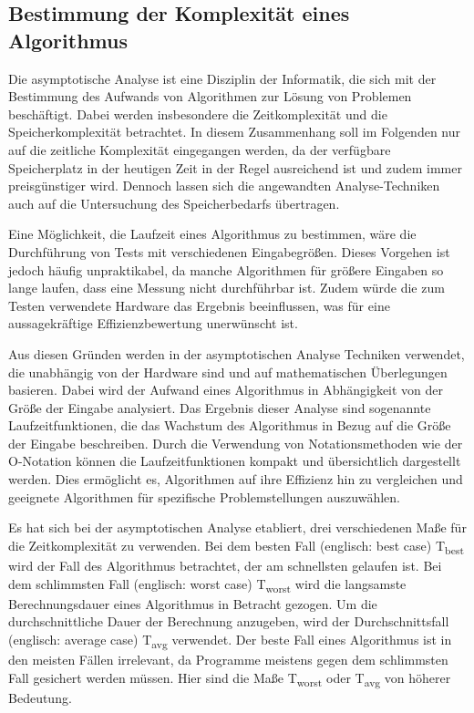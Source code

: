 \subsection{Bestimmung der Komplexität eines Algorithmus} \label{o-notation}
Die asymptotische Analyse ist eine Disziplin der Informatik, die sich mit der Bestimmung des Aufwands von Algorithmen zur Lösung von Problemen beschäftigt. Dabei werden insbesondere die Zeitkomplexität und die Speicherkomplexität betrachtet. In diesem Zusammenhang soll im Folgenden nur auf die zeitliche Komplexität eingegangen werden, da der verfügbare Speicherplatz in der heutigen Zeit in der Regel ausreichend ist und zudem immer preisgünstiger wird. Dennoch lassen sich die angewandten Analyse-Techniken auch auf die Untersuchung des Speicherbedarfs übertragen. \autocite[201]{hubwieser_fundamente_2015}

Eine Möglichkeit, die Laufzeit eines Algorithmus zu bestimmen, wäre die Durchführung von Tests mit verschiedenen Eingabegrößen. Dieses Vorgehen ist jedoch häufig unpraktikabel, da manche Algorithmen für größere Eingaben so lange laufen, dass eine Messung nicht durchführbar ist. Zudem würde die zum Testen verwendete Hardware das Ergebnis beeinflussen, was für eine aussagekräftige Effizienzbewertung unerwünscht ist.\autocite[201]{hubwieser_fundamente_2015}

Aus diesen Gründen werden in der asymptotischen Analyse Techniken verwendet, die unabhängig von der Hardware sind und auf mathematischen Überlegungen basieren. Dabei wird der Aufwand eines Algorithmus in Abhängigkeit von der Größe der Eingabe analysiert. Das Ergebnis dieser Analyse sind sogenannte Laufzeitfunktionen, die das Wachstum des Algorithmus in Bezug auf die Größe der Eingabe beschreiben. Durch die Verwendung von Notationsmethoden wie der O-Notation können die Laufzeitfunktionen kompakt und übersichtlich dargestellt werden. Dies ermöglicht es, Algorithmen auf ihre Effizienz hin zu vergleichen und geeignete Algorithmen für spezifische Problemstellungen auszuwählen.\autocite[201-203]{hubwieser_fundamente_2015}

Es hat sich bei der asymptotischen Analyse etabliert, drei verschiedenen Maße für die Zeitkomplexität zu verwenden. Bei dem besten Fall (englisch: best case) T\textsubscript{best} wird der Fall des Algorithmus betrachtet, der am schnellsten gelaufen ist. Bei dem schlimmsten Fall (englisch: worst case) T\textsubscript{worst} wird die langsamste Berechnungsdauer eines Algorithmus in Betracht gezogen. Um die durchschnittliche Dauer der Berechnung anzugeben, wird der Durchschnittsfall (englisch: average case) T\textsubscript{avg} verwendet. Der beste Fall eines Algorithmus ist in den meisten Fällen irrelevant, da Programme meistens gegen dem schlimmsten Fall gesichert werden müssen. Hier sind die Maße T\textsubscript{worst} oder T\textsubscript{avg} von höherer Bedeutung. \autocite[202]{hubwieser_fundamente_2015}

